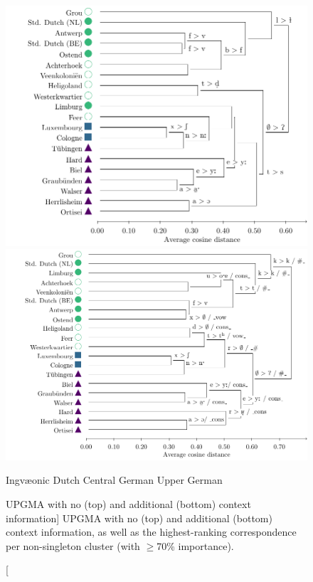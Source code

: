 \documentclass[a4paper]{article}
\def\upper{\color{purple}\FilledBigTriangleUp}
\def\central{\color{midblue}\FilledBigSquare}
\def\dutch{\color{green}\FilledBigCircle}
\def\ingv{\color{green}\BigCircle}
\begin{document}
\begin{figure}[h]
\begin{adjustwidth}{-1cm}{1cm}
\includegraphics[height=0.45\textheight]{figures/tfidf-nocontext.pdf}\\
\includegraphics[height=0.45\textheight]{figures/tfidf-context.pdf}
\end{adjustwidth}
\vspace{0.3em}
\begin{center}
{\ingv} Ingv\ae{}onic \hspace{1em}
{\dutch} Dutch \hspace{1em}
{\central} Central German \hspace{1em}
{\upper} Upper German
\end{center}
\caption
[UPGMA with no (top) and additional (bottom) context information]
{UPGMA with no (top) and additional (bottom) context information,
as well as the highest-ranking correspondence per non-singleton cluster
(with $\geq$70\% importance).}
\label{fig:tfidf-dendrograms}
\end{figure}
\end{document}
